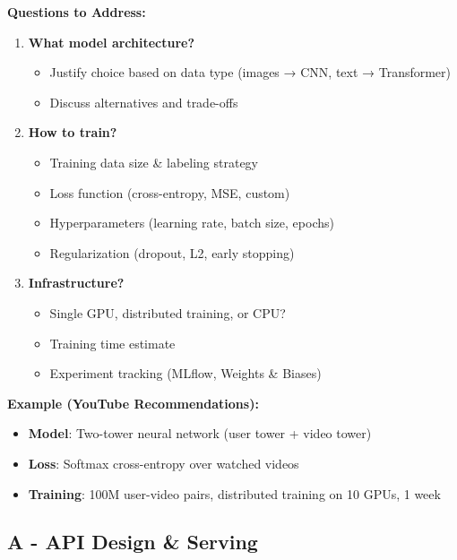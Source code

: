 \documentclass[10pt]{article}
\begin{document}
\textbf{Questions to Address:}
\begin{enumerate}
\item \textbf{What model architecture?}
\begin{itemize}
\item Justify choice based on data type (images → CNN, text → Transformer)
\item Discuss alternatives and trade-offs
\end{itemize}

\item \textbf{How to train?}
\begin{itemize}
\item Training data size \& labeling strategy
\item Loss function (cross-entropy, MSE, custom)
\item Hyperparameters (learning rate, batch size, epochs)
\item Regularization (dropout, L2, early stopping)
\end{itemize}

\item \textbf{Infrastructure?}
\begin{itemize}
\item Single GPU, distributed training, or CPU?
\item Training time estimate
\item Experiment tracking (MLflow, Weights \& Biases)
\end{itemize}
\end{enumerate}

\textbf{Example (YouTube Recommendations):}
\begin{itemize}
\item \textbf{Model}: Two-tower neural network (user tower + video tower)
\item \textbf{Loss}: Softmax cross-entropy over watched videos
\item \textbf{Training}: 100M user-video pairs, distributed training on 10 GPUs, 1 week
\end{itemize}

\subsection{A - API Design \& Serving}
\end{document}
